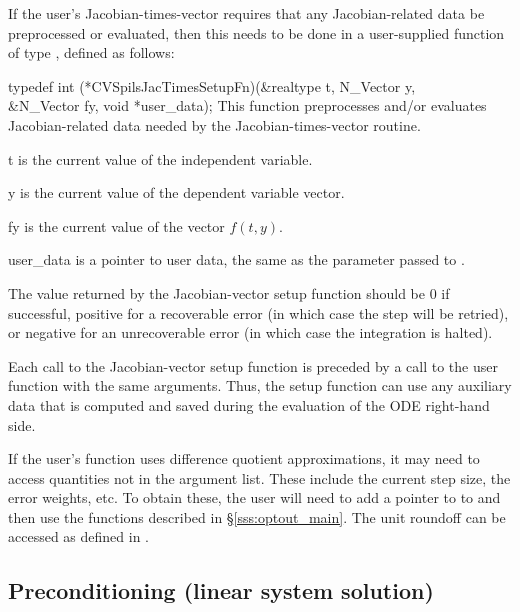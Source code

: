If the user's Jacobian-times-vector requires that any Jacobian-related data
be preprocessed or evaluated, then this needs to be done in a
user-supplied function of type , defined as follows:

{
  typedef int (*CVSpilsJacTimesSetupFn)(&realtype t, N\_Vector y, \\
                                        &N\_Vector fy, void *user\_data);
}
{
  This function preprocesses and/or evaluates Jacobian-related data needed
  by the Jacobian-times-vector routine.
}
{
  \begin{args}
  \item[t]
    is the current value of the independent variable.       
  \item[y] 
    is the current value of the dependent variable vector. 
  \item[fy]
    is the current value of the vector $f(t,y)$.
  \item[user\_data]
    is a pointer to user data, the same as the       
    parameter passed to .   
  \end{args}
}
{  
  The value returned by the Jacobian-vector setup function
  should be $0$ if successful, positive for a recoverable error (in
  which case the step will be retried), or negative for an
  unrecoverable error (in which case the integration is halted). } 
{
  Each call to the Jacobian-vector setup function is preceded by a call to
  the  user function with the same  arguments.  
  Thus, the setup function can use any auxiliary data that is computed
  and saved during the evaluation of the ODE right-hand side. 
  
  If the user's  function uses difference quotient
  approximations, it may need to access quantities not in the argument
  list. These include the current step size, the error weights, etc.
  To obtain these, the user will need to add a pointer to  
  to  and then use the  functions described in
  \S\ref{sss:optout_main}. The unit roundoff can be accessed as
   defined in .
}


\subsection{Preconditioning (linear system solution)} \label{ss:psolveFn}

